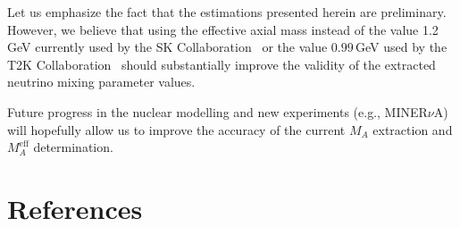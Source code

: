 \documentclass[preprint]{elsarticle}
\begin{document}
Let us emphasize the fact that the estimations presented herein are preliminary. However, we believe that using the effective axial mass instead of the value 1.2\,GeV currently used by the SK Collaboration~\cite{Wendell:2010md} or the value $0.99$\,GeV used by the T2K Collaboration~\cite{Abe:2011ks} should substantially improve the validity of the extracted neutrino mixing parameter values.

Future progress in the nuclear modelling and new experiments (e.g., MINER$\nu$A) will hopefully allow us to improve the accuracy of the current $M_A$ extraction and $M_{A}^{\mathrm{eff}}$ determination.

\section*{References}

\end{document}
